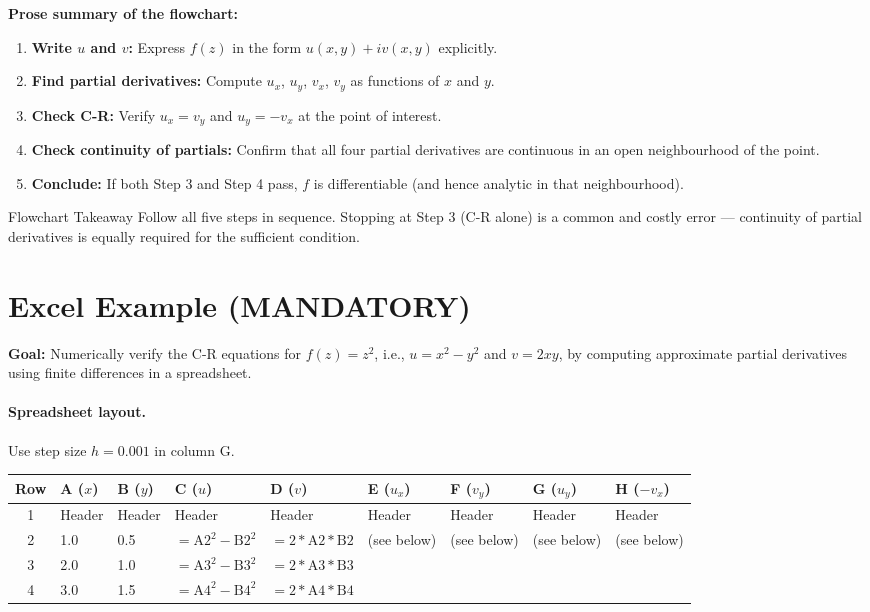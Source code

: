 \documentclass[12pt,a4paper]{article}
\begin{document}
\medskip

\textbf{Prose summary of the flowchart:}
\begin{enumerate}[noitemsep]
  \item \textbf{Write $u$ and $v$:} Express $f(z)$ in the form $u(x,y)+iv(x,y)$ explicitly.
  \item \textbf{Find partial derivatives:} Compute $u_x$, $u_y$, $v_x$, $v_y$ as functions of $x$ and $y$.
  \item \textbf{Check C-R:} Verify $u_x = v_y$ and $u_y = -v_x$ at the point of interest.
  \item \textbf{Check continuity of partials:} Confirm that all four partial derivatives are continuous in an open neighbourhood of the point.
  \item \textbf{Conclude:} If both Step 3 and Step 4 pass, $f$ is differentiable (and hence analytic in that neighbourhood).
\end{enumerate}

\begin{learnbox}{Flowchart Takeaway}
Follow all five steps in sequence. Stopping at Step 3 (C-R alone) is a common and costly error --- continuity of partial derivatives is equally required for the sufficient condition.
\end{learnbox}

\section{Excel Example (MANDATORY)}

\textbf{Goal:} Numerically verify the C-R equations for $f(z) = z^2$, i.e., $u = x^2-y^2$ and $v = 2xy$, by computing approximate partial derivatives using finite differences in a spreadsheet.

\paragraph{Spreadsheet layout.}

Use step size $h = 0.001$ in column G.

\begin{center}
\begin{tabular}{cllllllll}
\toprule
\textbf{Row} & \textbf{A} ($x$) & \textbf{B} ($y$) & \textbf{C} ($u$) & \textbf{D} ($v$) & \textbf{E} ($u_x$) & \textbf{F} ($v_y$) & \textbf{G} ($u_y$) & \textbf{H} ($-v_x$) \\
\midrule
1 & Header & Header & Header & Header & Header & Header & Header & Header \\
2 & 1.0 & 0.5 & $=\text{A2}^2-\text{B2}^2$ & $=2*\text{A2}*\text{B2}$ & (see below) & (see below) & (see below) & (see below) \\
3 & 2.0 & 1.0 & $=\text{A3}^2-\text{B3}^2$ & $=2*\text{A3}*\text{B3}$ & & & & \\
4 & 3.0 & 1.5 & $=\text{A4}^2-\text{B4}^2$ & $=2*\text{A4}*\text{B4}$ & & & & \\
\bottomrule
\end{tabular}
\end{center}
\end{document}
